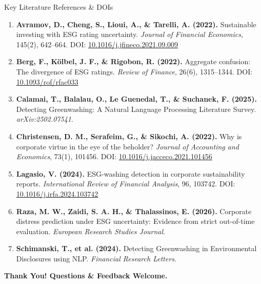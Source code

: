 \documentclass[aspectratio=169,10pt]{beamer}
\begin{document}
\begin{frame}[t]{Key Literature References & DOIs}
\scriptsize
\begin{enumerate}\setlength{\itemsep}{2pt}
  \item \textbf{Avramov, D., Cheng, S., Lioui, A., \& Tarelli, A. (2022).} Sustainable investing with ESG rating uncertainty. \emph{Journal of Financial Economics}, 145(2), 642--664. DOI: \href{https://doi.org/10.1016/j.jfineco.2021.09.009}{10.1016/j.jfineco.2021.09.009}
  \item \textbf{Berg, F., Kölbel, J. F., \& Rigobon, R. (2022).} Aggregate confusion: The divergence of ESG ratings. \emph{Review of Finance}, 26(6), 1315--1344. DOI: \href{https://doi.org/10.1093/rof/rfac033}{10.1093/rof/rfac033}
  \item \textbf{Calamai, T., Balalau, O., Le Guenedal, T., \& Suchanek, F. (2025).} Detecting Greenwashing: A Natural Language Processing Literature Survey. \emph{arXiv:2502.07541}.
  \item \textbf{Christensen, D. M., Serafeim, G., \& Sikochi, A. (2022).} Why is corporate virtue in the eye of the beholder? \emph{Journal of Accounting and Economics}, 73(1), 101456. DOI: \href{https://doi.org/10.1016/j.jacceco.2021.101456}{10.1016/j.jacceco.2021.101456}
  \item \textbf{Lagasio, V. (2024).} ESG-washing detection in corporate sustainability reports. \emph{International Review of Financial Analysis}, 96, 103742. DOI: \href{https://doi.org/10.1016/j.irfa.2024.103742}{10.1016/j.irfa.2024.103742}
  \item \textbf{Raza, M. W., Zaidi, S. A. H., \& Thalassinos, E. (2026).} Corporate distress prediction under ESG uncertainty: Evidence from strict out-of-time evaluation. \emph{European Research Studies Journal}.
  \item \textbf{Schimanski, T., et al. (2024).} Detecting Greenwashing in Environmental Disclosures using NLP. \emph{Financial Research Letters}.
\end{enumerate}
\vspace{6pt}
\centering\small\textbf{Thank You! Questions \& Feedback Welcome.}
\end{frame}
\end{document}
